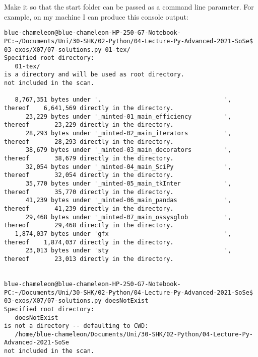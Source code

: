 \documentclass[
	english,
	fontsize=10pt,
	parskip=half,
	titlepage=true,
	DIV=12
]{scrartcl}
\begin{document}
Make it so that the start folder can be passed as a command line parameter. For example, on my machine I can produce this console output:
\begin{verbatim}
blue-chameleon@blue-chameleon-HP-250-G7-Notebook-PC:~/Documents/Uni/30-SHK/02-Python/04-Lecture-Py-Advanced-2021-SoSe$ 03-exos/X07/07-solutions.py 01-tex/
Specified root directory:
   01-tex/
is a directory and will be used as root directory.
not included in the scan.

   8,767,351 bytes under '.                                  ', thereof    6,641,569 directly in the directory.
      23,229 bytes under '_minted-01_main_efficiency         ', thereof       23,229 directly in the directory.
      28,293 bytes under '_minted-02_main_iterators          ', thereof       28,293 directly in the directory.
      38,679 bytes under '_minted-03_main_decorators         ', thereof       38,679 directly in the directory.
      32,054 bytes under '_minted-04_main_SciPy              ', thereof       32,054 directly in the directory.
      35,770 bytes under '_minted-05_main_tkInter            ', thereof       35,770 directly in the directory.
      41,239 bytes under '_minted-06_main_pandas             ', thereof       41,239 directly in the directory.
      29,468 bytes under '_minted-07_main_ossysglob          ', thereof       29,468 directly in the directory.
   1,874,037 bytes under 'gfx                                ', thereof    1,874,037 directly in the directory.
      23,013 bytes under 'sty                                ', thereof       23,013 directly in the directory.


blue-chameleon@blue-chameleon-HP-250-G7-Notebook-PC:~/Documents/Uni/30-SHK/02-Python/04-Lecture-Py-Advanced-2021-SoSe$ 03-exos/X07/07-solutions.py doesNotExist
Specified root directory:
   doesNotExist
is not a directory -- defaulting to CWD:
   /home/blue-chameleon/Documents/Uni/30-SHK/02-Python/04-Lecture-Py-Advanced-2021-SoSe
not included in the scan.


\end{verbatim}
\end{document}
